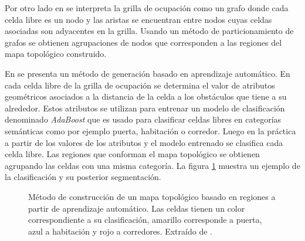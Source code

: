 Por otro lado en \cite{zivkovic2006hierarchical} se interpreta la grilla de
ocupación como un grafo donde cada celda libre es un nodo y las aristas se
encuentran entre nodos cuyas celdas asociadas son adyacentes en la grilla.
Usando un método de particionamiento de grafos se obtienen agrupaciones de
nodos que corresponden a las regiones del mapa topológico construido.

En \cite{martinez2006semantic} se presenta un método de generación basado en
aprendizaje automático. En cada celda libre de la grilla de ocupación se
determina el valor de atributos geométricos asociados a la distancia de la
celda a los obstáculos que tiene a su alrededor. Estos atributos se utilizan
para entrenar un modelo de clasificación denominado \emph{AdaBoost}
\cite{schapire1999improved} que es usado para clasificar celdas libres en
categorías semánticas como por ejemplo puerta, habitación o corredor. Luego en
la práctica a partir de los valores de los atributos y el modelo entrenado se
clasifica cada celda libre. Las regiones que conforman el mapa topológico se
obtienen agrupando las celdas con una misma categoría. La figura
\ref{fig:ejMartinezTop} muestra un ejemplo de la clasificación y su posterior
segmentación.

\begin{figure}[H]
  \centering
  \qquad
  \caption[Método de construcción de un mapa topológico basado en regiones a partir de aprendizaje automático.]{Método de construcción de un mapa topológico basado en regiones a partir de aprendizaje automático. Las celdas tienen un color correspondiente a su clasificación, amarillo corresponde a puerta, azul a habitación y rojo a corredores. Extraído de \cite{martinez2006semantic}.}\label{fig:ejMartinezTop}
\end{figure}

